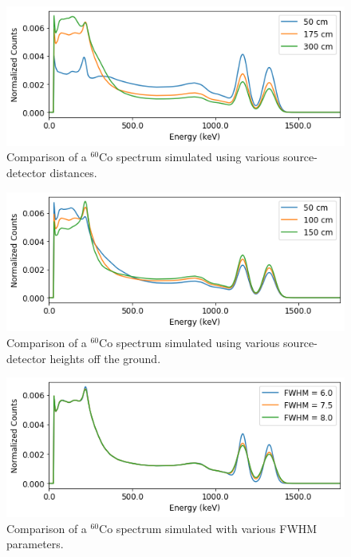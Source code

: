 \begin{figure}[H]
\centering
\includegraphics[width=0.75\linewidth]{images/sim_spectra_distance_comparison}
\caption{Comparison of a $^{60}$Co spectrum simulated using various source-detector distances.}
\label{fig:sim_spectra_distance_comparison}
\end{figure}

\begin{figure}[H]
\centering
\includegraphics[width=0.75\linewidth]{images/sim_spectra_height_comparison}
\caption{Comparison of a $^{60}$Co spectrum simulated using various source-detector heights off the ground.}
\label{fig:sim_spectra_height_comparison}
\end{figure}


\begin{figure}[H]
\centering
\includegraphics[width=0.75\linewidth]{images/sim_spectra_FWHM_comparison}
\caption{Comparison of a $^{60}$Co spectrum simulated with various FWHM parameters.}
\label{fig:sim_spectra_FWHM_comparison}
\end{figure}





